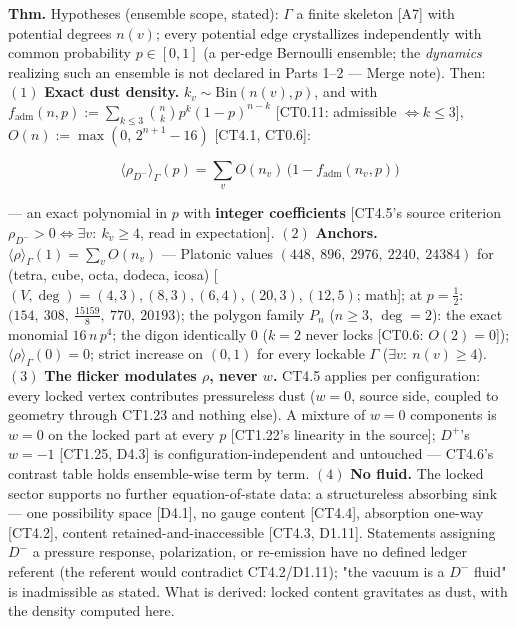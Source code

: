 \begin{theorem}[{\texorpdfstring{CT4.5a — The flicker-dust ensemble: exact density polynomial and rate-invariant $w=0$}{CT4.5a - The flicker-dust ensemble: exact density polynomial and rate-invariant}}]\label{tag:CT4-5a}
\textbf{Thm.} Hypotheses (ensemble scope, stated): $\Gamma$ a finite skeleton [A7] with potential degrees $n(v)$; every potential edge crystallizes independently with common probability $p\in[0,1]$ (a per-edge Bernoulli ensemble; the \textit{dynamics} realizing such an ensemble is not declared in Parts 1–2 — Merge note). Then: $(1)$ \textbf{Exact dust density.} $k_v\sim\mathrm{Bin}(n(v),p)$, and with $f_{\mathrm{adm}}(n,p):=\sum_{k\le3}\binom{n}{k}p^k(1-p)^{n-k}$ [CT0.11: admissible $\iff k\le3$], $O(n):=\max(0,\,2^{n+1}-16)$ [CT4.1, CT0.6]:

\[
\langle\rho_{D^-}\rangle_\Gamma(p)=\sum_v O(n_v)\,\bigl(1-f_{\mathrm{adm}}(n_v,p)\bigr)
\]

— an exact polynomial in $p$ with \textbf{integer coefficients} [CT4.5's source criterion $\rho_{D^-}>0\iff\exists v:\ k_v\ge4$, read in expectation]. $(2)$ \textbf{Anchors.} $\langle\rho\rangle_\Gamma(1)=\sum_vO(n_v)$ — Platonic values $(448,\ 896,\ 2976,\ 2240,\ 24384)$ for (tetra, cube, octa, dodeca, icosa) [$(V,\deg)=(4,3),(8,3),(6,4),(20,3),(12,5)$; math]; at $p=\tfrac12$: $\bigl(154,\ 308,\ \tfrac{15159}{8},\ 770,\ 20193\bigr)$; the polygon family $P_n$ ($n\ge3$, $\deg=2$): the exact monomial $16\,n\,p^4$; the digon identically $0$ ($k=2$ never locks [CT0.6: $O(2)=0$]); $\langle\rho\rangle_\Gamma(0)=0$; strict increase on $(0,1)$ for every lockable $\Gamma$ ($\exists v:\ n(v)\ge4$). $(3)$ \textbf{The flicker modulates $\rho$, never $w$.} CT4.5 applies per configuration: every locked vertex contributes pressureless dust ($w=0$, source side, coupled to geometry through CT1.23 and nothing else). A mixture of $w=0$ components is $w=0$ on the locked part at every $p$ [CT1.22's linearity in the source]; $D^+$'s $w=-1$ [CT1.25, D4.3] is configuration-independent and untouched — CT4.6's contrast table holds ensemble-wise term by term. $(4)$ \textbf{No fluid.} The locked sector supports no further equation-of-state data: a structureless absorbing sink — one possibility space [D4.1], no gauge content [CT4.4], absorption one-way [CT4.2], content retained-and-inaccessible [CT4.3, D1.11]. Statements assigning $D^-$ a pressure response, polarization, or re-emission have no defined ledger referent (the referent would contradict CT4.2/D1.11); "the vacuum is a $D^-$ fluid" is inadmissible as stated. What is derived: locked content gravitates as dust, with the density computed here.


\end{theorem}
